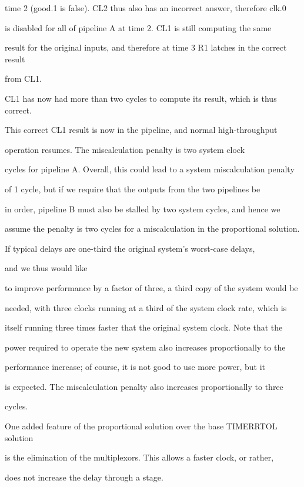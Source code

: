 \documentclass[12pt,dvips]{article}
\begin{document}
time 2 (good.1 is false). CL2 thus also has an incorrect answer, therefore clk.0

is disabled for all of pipeline A at time 2. CL1 is still computing the same

result for the original inputs, and therefore at time 3 R1 latches in the correct result

from CL1.

CL1 has now had more than two cycles to compute its result, which is thus correct.

This correct CL1 result is now in the pipeline, and normal high-throughput

operation resumes. The miscalculation penalty is two system clock

cycles for pipeline A. Overall, this could lead to a system miscalculation penalty

of 1 cycle, but if we require that the outputs from the two pipelines be

in order, pipeline B must also be stalled by two system cycles, and hence we

assume the penalty is two cycles for a miscalculation in the proportional solution.



If typical delays are one-third the original system's worst-case delays,

and we thus would like

to improve performance by a factor of three, a third copy of the system would be

needed, with three clocks running at a third of the system clock rate, which is

itself running three times faster that the original system clock. Note that the

power required to operate the new system also increases proportionally to the

performance increase; of course, it is not good to use more power, but it

is expected. The miscalculation penalty also increases proportionally to three

cycles.



One added feature of the proportional solution over the base TIMERRTOL solution

is the elimination of the multiplexors. This allows a faster clock, or rather,

does not increase the delay through a stage.
\end{document}

